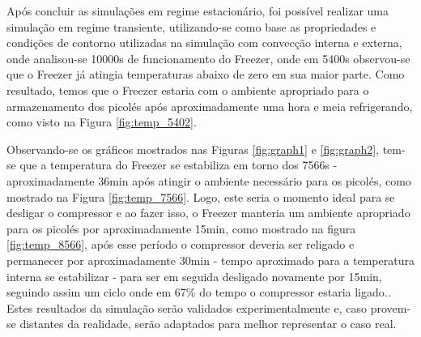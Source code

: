 \begin{itemize}
Após concluir as simulações em regime estacionário, foi possível realizar uma simulação em regime transiente, utilizando-se como base as propriedades e condições de contorno utilizadas na simulação com convecção interna e externa, onde analisou-se 10000s de funcionamento do Freezer, onde em 5400s observou-se que o Freezer já atingia temperaturas abaixo de zero em sua maior parte. Como resultado, temos que o Freezer estaria com o ambiente apropriado para o armazenamento dos picolés após aproximadamente uma hora e meia refrigerando, como visto na Figura \ref{fig:temp_5402}.


Observando-se os gráficos mostrados nas Figuras \ref{fig:graph1} e \ref{fig:graph2}, tem-se que a temperatura do Freezer se estabiliza em torno dos 7566s - aproximadamente 36min após atingir o ambiente necessário para os picolés, como mostrado na Figura \ref{fig:temp_7566}. Logo, este seria o momento ideal para se desligar o compressor e ao fazer isso, o Freezer manteria um ambiente apropriado para os picolés por aproximadamente 15min, como mostrado na figura \ref{fig:temp_8566}, após esse período o compressor deveria ser religado e permanecer por aproximadamente 30min - tempo aproximado para a temperatura interna se estabilizar - para ser em seguida desligado novamente por 15min, seguindo assim um ciclo onde em 67\% do tempo o compressor estaria ligado.. Estes resultados da simulação serão validados experimentalmente e, caso provem-se distantes da realidade, serão adaptados para melhor representar o caso real. 



\end{itemize}
